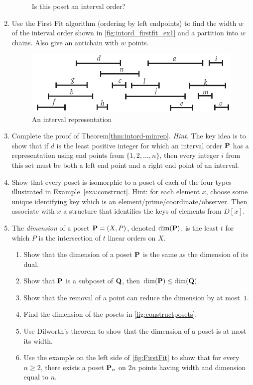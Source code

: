 \begin{enumerate}
\begin{figure}[h]
\begin{center}
  \end{center}
  \caption{Is this poset an interval order?}\label{fig:intord_find_rep_ex3}
  \end{figure}
\item Use the First Fit algorithm (ordering by left endpoints) to find
  the width $w$ of the interval order shown in
  \autoref{fig:intord_firstfit_ex1} and a partition into $w$
  chains. Also give an antichain with $w$ points.
  \begin{figure}[h]
    \centering
    \includegraphics{posets-figs/intord_firstfit_ex1}
    \caption{An interval representation}
    \label{fig:intord_firstfit_ex1}
  \end{figure}
\item Complete the proof of Theorem\ref{thm:intord-minrep}.  \textit{Hint.}
  The key idea is to show that if $d$ is the least positive integer for
  which an interval order $\mathbf{P}$ has a representation using end points from
  $\{1,2,\dots,n\}$, then every integer $i$ from this set must be both a left
  end point and a right end point of an interval.
\item Show that every poset is isomorphic to a poset of each of the four types
  illustrated in Example~\ref{exa:construct}.  Hint: for each element $x$, choose
  some unique identifying key which is an element/prime/coordinate/observer.  Then associate
  with $x$ a structure that identifies the keys of elements from $D[x]$. 
\item The \textit{dimension} of a poset $\mathbf{P}=(X,P)$, denoted $\dim(\mathbf{P})$, is the least $t$ for 
  which $P$ is the intersection of $t$ linear orders on $X$.
  \begin{enumerate}
   \item Show that the dimension of a poset $\mathbf{P}$ is the same as the dimension of its dual.
   \item Show that $\mathbf{P}$ is a subposet of $\mathbf{Q}$, then $\dim(\mathbf{P})\le \dim(\mathbf{Q})$.
   \item Show that the removal of a point can reduce the dimension by at most~$1$.
   \item Find the dimension of the posets in \autoref{fig:constructposets}.
   \item Use Dilworth's theorem to show that the dimension of a poset is at most its width.
   \item Use the example on the left side of \autoref{fig:FirstFit} to show that
   for every $n\ge2$, there exists a poset $\mathbf{P}_n$ on $2n$ points having width and dimension
   equal to $n$.
   \end{enumerate}
\end{enumerate}

